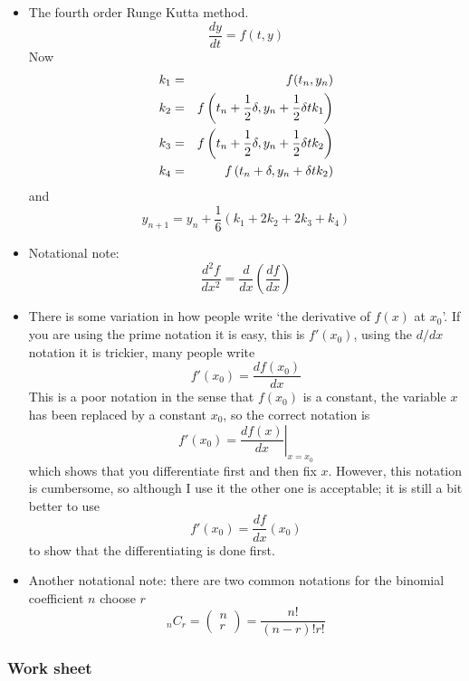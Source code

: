 \documentclass[12pt]{article}
\begin{document}
\begin{itemize}
\item The fourth order Runge Kutta method.
\begin{equation}
\frac{dy}{dt}=f(t,y)
\end{equation}
Now
\begin{eqnarray}
k_1&=&f(t_n,y_n)\cr
k_2&=&f\left(t_n+\frac{1}{2}\delta,y_n+\frac{1}{2}\delta tk_1\right)\cr 
k_3&=&f\left(t_n+\frac{1}{2}\delta,y_n+\frac{1}{2}\delta tk_2\right)\cr 
k_4&=&f\left(t_n+\delta,y_n+\delta tk_2\right) 
\end{eqnarray}
and 
\begin{equation}
y_{n+1}=y_n+\frac{1}{6}(k_1+2k_2+2k_3+k_4)
\end{equation}
\item Notational note: 
\begin{equation}
\frac{d^2f}{dx^2}=\frac{d}{dx}\left(\frac{df}{dx}\right)
\end{equation}
\item There is some variation in how people write \lq{}the derivative of $f(x)$ at $x_0$\rq{}. If you are using the prime notation it is easy, this is $f'(x_0)$, using the $d/dx$ notation it is trickier, many people write 
\begin{equation}
f'(x_0)=\frac{df(x_0)}{dx}
\end{equation}
This is a poor notation in the sense that $f(x_0)$ is a constant, the variable $x$ has been replaced by a constant $x_0$, so the correct notation is 
\begin{equation}
f'(x_0)=\left.\frac{df(x)}{dx}\right|_{x=x_0}
\end{equation}
which shows that you differentiate first and then fix $x$. However, this notation is cumbersome, so although I use it the other one is acceptable; it is still a bit better to use
\begin{equation}
f'(x_0)=\frac{df}{dx}(x_0)
\end{equation}
to show that the differentiating is done first.
\item Another notational note: there are two common notations for the binomial coefficient $n$ choose $r$
\begin{equation}
_nC_r=\left(\begin{array}{c}n\\r\end{array}\right)=\frac{n!}{(n-r)!r!}
\end{equation}
\end{itemize}


\subsubsection*{Work sheet}
\end{document}
